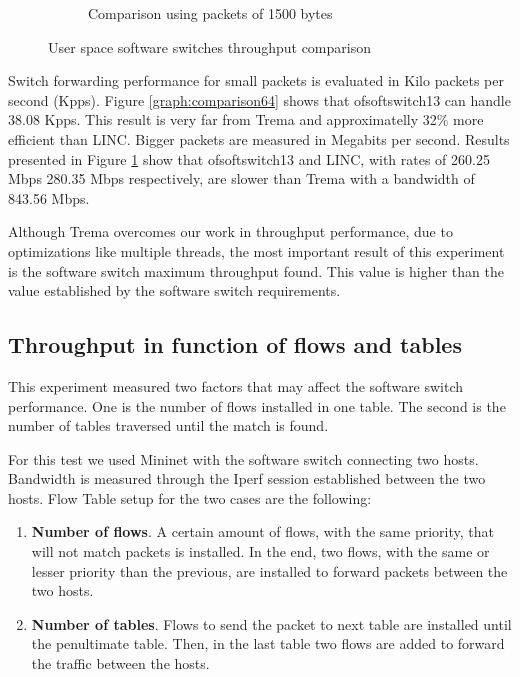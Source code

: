 \begin{figure}[H]
\begin{minipage}{\textwidth}
\begin{subfigure}{.7\textwidth}
            \caption{Comparison using packets of 1500 bytes}
            \label{graph:comparison1500}
        \end{subfigure}
        \end{minipage}
        \caption{User space software switches throughput comparison}
        \label{graph:comparison}
    \end{figure}
  
   Switch forwarding performance for small packets is evaluated in Kilo packets per second (Kpps). Figure \ref{graph:comparison64} shows that ofsoftswitch13 can handle 38.08 Kpps. This result is very 
   far from Trema and approximatelly 32\% more efficient than LINC. Bigger packets are measured in Megabits per second. Results presented in Figure \ref{graph:comparison1500} show that ofsoftswitch13 and LINC, with rates of 260.25 Mbps 280.35 Mbps respectively, are slower than Trema with a bandwidth of 843.56 Mbps. 
   
    Although Trema overcomes our work in throughput performance, due to optimizations like multiple threads, the most important result of this experiment is the software switch maximum throughput found. This value is higher than the value established by the software switch requirements. 
    
    \subsection{Throughput in function of flows and tables}
    \label{sec:bandflows}
    This experiment measured two factors that may affect the software switch performance. One is the number of flows installed in one table. The second is the number of tables traversed until the match is found.
    
    For this test we used Mininet with the software switch connecting two hosts. Bandwidth is measured through the  Iperf session established between the two hosts. Flow Table setup for the two cases are the following: 
    
    \begin{enumerate}[label=(\Alph*)]
    \item \textbf{Number of flows}. A certain amount of flows, with the same priority, that will not match packets is installed. In the end, two flows, with the same or lesser priority than the previous, are installed to forward packets between the two hosts.
    \item \textbf{Number of tables}. Flows to send the packet to next table are installed until the penultimate table. Then, in the last table two flows are added to forward the traffic between the hosts.
    \end{enumerate}
    
